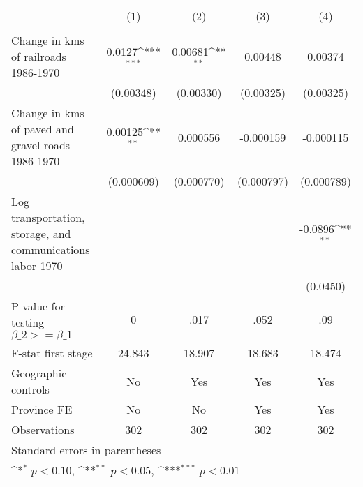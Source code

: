 {
\def\sym#1{\ifmmode^{#1}\else\(^{#1}\)\fi}
\begin{tabular}{l*{4}{c}}
\hline\hline
                &\multicolumn{1}{c}{(1)}&\multicolumn{1}{c}{(2)}&\multicolumn{1}{c}{(3)}&\multicolumn{1}{c}{(4)}\\
                &\multicolumn{1}{c}{}&\multicolumn{1}{c}{}&\multicolumn{1}{c}{}&\multicolumn{1}{c}{}\\
\hline
Change in kms of railroads 1986-1970&   0.0127\sym{***}&  0.00681\sym{**} &  0.00448         &  0.00374         \\
                &(0.00348)         &(0.00330)         &(0.00325)         &(0.00325)         \\
[1em]
Change in kms of paved and gravel roads 1986-1970&  0.00125\sym{**} & 0.000556         &-0.000159         &-0.000115         \\
                &(0.000609)         &(0.000770)         &(0.000797)         &(0.000789)         \\
[1em]
Log transportation, storage, and communications labor 1970&                  &                  &                  &  -0.0896\sym{**} \\
                &                  &                  &                  & (0.0450)         \\
\hline
P-value for testing $\beta\_{2} >= \beta\_{1}$&        0         &     .017         &     .052         &      .09         \\
F-stat first stage&   24.843         &   18.907         &   18.683         &   18.474         \\
Geographic controls&       No         &      Yes         &      Yes         &      Yes         \\
Province FE     &       No         &       No         &      Yes         &      Yes         \\
Observations    &      302         &      302         &      302         &      302         \\
\hline\hline
\multicolumn{5}{l}{\footnotesize Standard errors in parentheses}\\
\multicolumn{5}{l}{\footnotesize \sym{*} \(p<0.10\), \sym{**} \(p<0.05\), \sym{***} \(p<0.01\)}\\
\end{tabular}
}
